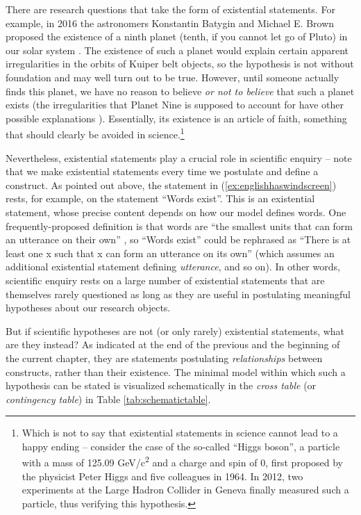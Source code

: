 There are research questions that take the form of existential statements. For example, in 2016 the astronomers Konstantin Batygin and Michael E. Brown proposed the existence of a ninth planet (tenth, if you cannot let go of Pluto) in our solar system \citep{batygin_evidence_2016}. The existence of such a planet would explain certain apparent irregularities in the orbits of Kuiper belt objects, so the hypothesis is not without foundation and may well turn out to be true. However, until someone actually finds this planet, we have no reason to believe \textit{or not to believe} that such a planet exists (the irregularities that Planet Nine is supposed to account for have other possible explanations \citep[cf., e.g.][]{shankman_ossos._2017}). Essentially, its existence is an article of faith, something that should clearly be avoided in science.\footnote{Which is not to say that existential statements in science cannot lead to a happy ending -- consider the case of the so-called ``Higgs boson'', a particle with a mass of 125.09 GeV/c\textsuperscript{2} and a charge and spin of 0, first proposed by the physicist Peter Higgs and five colleagues in 1964. In 2012, two experiments at the Large Hadron Collider in Geneva finally measured such a particle, thus verifying this hypothesis.}

Nevertheless, existential statements play a crucial role in scientific enquiry -- note that we make existential statements every time we postulate and define a construct. As pointed out above, the statement in (\ref{ex:englishhaswindscreen}) rests, for example, on the statement ``Words exist''. This is an existential statement, whose precise content depends on how our model defines words. One frequently-proposed definition is that words are ``the smallest units that can form an utterance on their own'' \citep[436]{matthews_concise_2014}, so ``Words exist'' could be rephrased as ``There is at least one x such that x can form an utterance on its own'' (which assumes an additional existential statement defining \emph{utterance}, and so on). In other words, scientific enquiry rests on a large number of existential statements that are themselves rarely questioned as long as they are useful in postulating meaningful hypotheses about our research objects.

But if scientific hypotheses are not (or only rarely) existential statements, what are they instead? As indicated at the end of the previous and the beginning of the current chapter, they are statements postulating \emph{relationships} between constructs, rather than their existence. The minimal model within which such a hypothesis can be stated is visualized schematically in the \emph{cross table} (or \emph{contingency table}) in Table \ref{tab:schematictable}.

